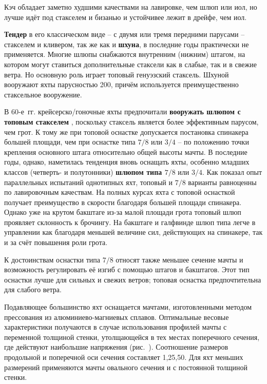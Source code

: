 Кэч обладает заметно худшими качествами на лавировке, чем шлюп или
иол, но лучше идёт под стакселем и бизанью и устойчивее лежит в
дрейфе, чем иол.

\textbf{Тендер} в его классическом
виде \--- с двумя или тремя передними парусами \--- стакселем и
кливером, так же как и
\textbf{шхуна}, в последние годы
практически не применяется. Многие шлюпы снабжаются внутренним
(нижним) штагом, на котором могут ставиться дополнительные стаксели
как в слабые, так и в свежие ветра. Но основную роль играет топовый
генуэзский стаксель. Шхуной вооружают яхты парусностью 200\msq, причём используется преимущественно стаксельное вооружение.

В 60-е~гг. крейсерско\-/гоночные яхты предпочитали \textbf{вооружать шлюпом с
топовым стакселем} ,
поскольку стаксель является более эффективным парусом, чем грот. К
тому же при топовой оснастке допускается постановка спинакера большей
площади, чем при оснастке типа $7/8$ или $3/4$ \--- по положению точки
крепления основного штага относительно общей высоты мачты. В последние
годы, однако, наметилась тенденция вновь оснащать яхты, особенно
младших классов (четверть- и полутонники) \textbf{шлюпом типа
$7/8$} или
$3/4$. Как
показал опыт параллельных испытаний однотипных яхт, топовый и $7/8$
варианты равноценны по лавировочным качествам. На полных курсах яхта с
топовой оснасткой получает преимущество в скорости благодаря большей
площади спинакера. Однако уже на крутом бакштаге из-за малой площади
грота топовый шлюп проявляет склонность к брочингу. На бакштаге и
галфвинде шлюп типа легче в управлении как благодаря меньшей величине
сил, действующих на спинакере, так и за счёт повышения роли грота.

К достоинствам оснастки типа $7/8$ относят также меньшее сечение мачты и
возможность регулировать её изгиб с помощью штагов и бакштагов. Этот
тип оснастки лучше для сильных и свежих ветров; топовая оснастка
предпочтительна для слабого ветра.

Подавляющее большинство яхт оснащается мачтами, изготовленными методом
прессования из алюминиево-магниевых сплавов. Оптимальные весовые
характеристики получаются в случае использования профилей мачты с
переменной толщиной стенки, утолщающейся в тех местах поперечного
сечения, где действуют наибольшие напряжения
(рис.~). Соотношение размеров продольной и поперечной оси
сечения составляет 1,25,50. Для яхт меньших размерений
применяются мачты овального сечения и с постоянной толщиной стенки.

